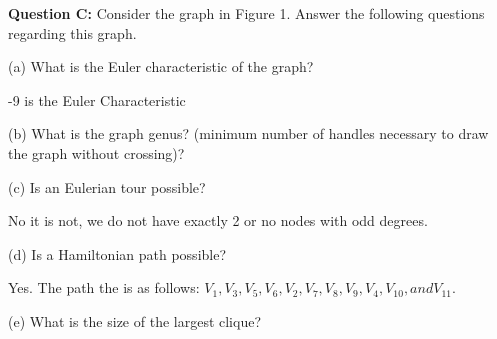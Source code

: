 \documentclass[12pt]{article}
\begin{document}
\bigskip
\noindent
\textbf{Question C:} Consider the graph in Figure 1. Answer the following questions regarding this graph.\smallskip

\smallskip
\noindent
(a) What is the Euler characteristic of the graph?\smallskip

-9 is the Euler Characteristic

\smallskip
\noindent
(b) What is the graph genus? (minimum number of handles necessary to draw the graph without crossing)?\smallskip

\smallskip
\noindent
(c) Is an Eulerian tour possible?\smallskip

No it is not, we do not have exactly 2 or no nodes with odd degrees. \smallskip

\smallskip
\noindent
(d) Is a Hamiltonian path possible?\smallskip

Yes. The path the is as follows: $V_1, V_3, V_5, V_6, V_2, V_7, V_8, V_9, V_4, V_10, and V_11$. \smallskip

\smallskip
\noindent
(e) What is the size of the largest clique?
\smallskip
\end{document}

